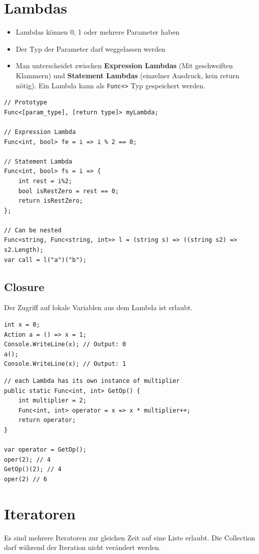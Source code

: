 \documentclass[
a4paper,
oneside,
10pt,
fleqn,
headsepline,
toc=listofnumbered, 
bibliography=totocnumbered]{scrartcl}
\let\stdsection\section
\renewcommand\section{\clearpage\stdsection}
\begin{document}

\section{Lambdas}
\begin{itemize}
	\item Lambdas können 0, 1 oder mehrere Parameter haben
	\item Der Typ der Parameter darf weggelassen werden
	\item Man unterscheidet zwischen \textbf{Expression Lambdas} (Mit geschweiften Klammern) und \textbf{Statement Lambdas} (einzelner Ausdruck, kein return nötig). Ein Lambda kann als \lstinline|Func<>| Typ gespeichert werden. 
\end{itemize}

\begin{lstlisting}
// Prototype
Func<[param_type], [return type]> myLambda;

// Expression Lambda
Func<int, bool> fe = i => i % 2 == 0;

// Statement Lambda
Func<int, bool> fs = i => {
	int rest = i%2;
	bool isRestZero = rest == 0;
	return isRestZero;
};

// Can be nested
Func<string, Func<string, int>> l = (string s) => ((string s2) => s2.Length);
var call = l("a")("b");
\end{lstlisting}

\subsection{Closure}
Der Zugriff auf lokale Variablen aus dem Lambda ist erlaubt. 
\begin{lstlisting}
int x = 0;
Action a = () => x = 1;
Console.WriteLine(x); // Output: 0
a();
Console.WriteLine(x); // Output: 1
\end{lstlisting}

\begin{lstlisting}
// each Lambda has its own instance of multiplier
public static Func<int, int> GetOp() {
	int multiplier = 2;
	Func<int, int> operator = x => x * multiplier++;
	return operator;
}

var operator = GetOp();
oper(2); // 4
GetOp()(2); // 4
oper(2) // 6
\end{lstlisting}


\section{Iteratoren}
Es sind mehrere Iteratoren zur gleichen Zeit auf eine Liste erlaubt. Die Collection darf während der Iteration nicht verändert werden. 
\end{document}
